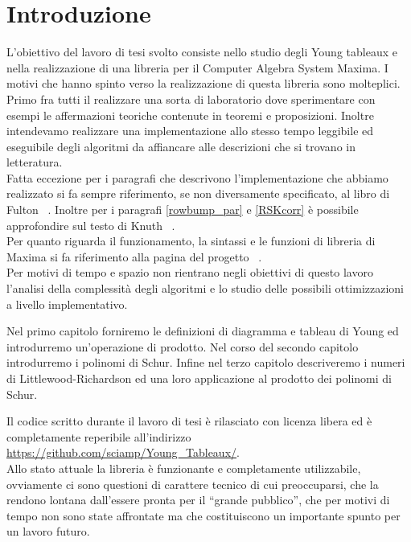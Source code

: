 \chapter*{Introduzione}
L'obiettivo del lavoro di tesi svolto consiste nello studio degli
Young tableaux e nella realizzazione di una libreria per il Computer
Algebra System Maxima. I motivi che hanno spinto verso la
realizzazione di questa libreria sono molteplici. Primo fra tutti il realizzare una sorta
di laboratorio dove sperimentare con esempi le affermazioni teoriche
contenute in teoremi e proposizioni. Inoltre intendevamo realizzare
una implementazione allo stesso tempo leggibile ed eseguibile degli
algoritmi da affiancare alle descrizioni che si trovano in
letteratura.\\
Fatta eccezione per i paragrafi che descrivono l'implementazione che
abbiamo realizzato si fa sempre riferimento, se non diversamente
specificato, al libro di Fulton ~\cite{fulton1997young}. Inoltre per i
paragrafi \ref{rowbump_par} e \ref{RSKcorr} \`e possibile
approfondire sul testo di Knuth ~\cite{knuthart}.\\
Per quanto riguarda il funzionamento, la sintassi e le funzioni di
libreria di Maxima si fa riferimento alla pagina del progetto ~\cite{maxima_doc}.\\
Per motivi di tempo e spazio non rientrano negli obiettivi di questo
lavoro l'analisi della complessit\`a
degli algoritmi e lo studio delle possibili ottimizzazioni a livello
implementativo.

Nel primo capitolo forniremo le definizioni di diagramma e tableau di
Young ed introdurremo un'operazione di prodotto. Nel corso del secondo
capitolo introdurremo i polinomi di Schur. Infine nel terzo capitolo
descriveremo i numeri di Littlewood-Richardson ed una loro
applicazione al prodotto dei polinomi di Schur.

Il codice scritto durante il lavoro di tesi \`e rilasciato con licenza libera ed \`e
completamente reperibile all'indirizzo
\url{https://github.com/sciamp/Young_Tableaux/}.\\
Allo stato attuale la libreria \`e funzionante e completamente utilizzabile,
ovviamente ci sono questioni di carattere tecnico di cui preoccuparsi,
che la rendono lontana dall'essere pronta per il ``grande pubblico'',
che per motivi di tempo non sono state affrontate ma che costituiscono
un importante spunto per un lavoro futuro.
